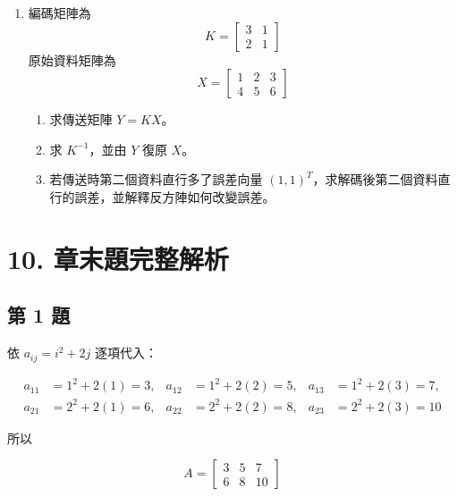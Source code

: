 \documentclass[11pt,a4paper]{article}
\providecommand{\tightlist}{%
  \setlength{\itemsep}{0pt}\setlength{\parskip}{0pt}}
\begin{document}
\begin{enumerate}
  \begin{enumerate}
  \def\labelenumii{\arabic{enumii}.}
  \tightlist
  \item
    求 \(A,t\)。
  \item
    已知觀測輸出是 \((5,4)\)，求原坐標。
  \item
    將位移向量 \(Y-t\) 表示成 \(A\) 的兩個直行向量的線性組合，並說明係數與原坐標的關係。
  \end{enumerate}
\item
  編碼矩陣為
  \[
  K=\begin{bmatrix}3&1\\2&1\end{bmatrix}
  \]
  原始資料矩陣為
  \[
  X=\begin{bmatrix}1&2&3\\4&5&6\end{bmatrix}
  \]

  \begin{enumerate}
  \def\labelenumii{\arabic{enumii}.}
  \tightlist
  \item
    求傳送矩陣 \(Y=KX\)。
  \item
    求 \(K^{-1}\)，並由 \(Y\) 復原 \(X\)。
  \item
    若傳送時第二個資料直行多了誤差向量 \((1,1)^T\)，求解碼後第二個資料直行的誤差，並解釋反方陣如何改變誤差。
  \end{enumerate}
\end{enumerate}

\section{10. 章末題完整解析}\label{ux7ae0ux672bux984cux5b8cux6574ux89e3ux6790}

\subsection{第 1 題}\label{ux7b2c-1-ux984c}

依 \(a_{ij}=i^2+2j\) 逐項代入：

\[
\begin{aligned}
a_{11}&=1^2+2(1)=3,&a_{12}&=1^2+2(2)=5,&a_{13}&=1^2+2(3)=7,\\
a_{21}&=2^2+2(1)=6,&a_{22}&=2^2+2(2)=8,&a_{23}&=2^2+2(3)=10
\end{aligned}
\]

所以

\[
A=\begin{bmatrix}3&5&7\\6&8&10\end{bmatrix}
\]
\end{document}
